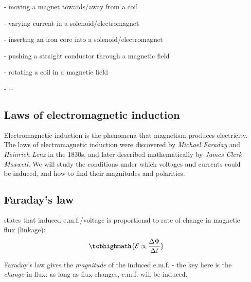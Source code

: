 \begin{compactenum}
	\item[-] moving a magnet towards/away from a coil
	
	\item[-] varying current in a solenoid/electromagnet
	
	\item[-] inserting an iron core into a solenoid/electromagnet
	
	\item[-] pushing a straight conductor through a magnetic field
	
	\item[-] rotating a coil in a magnetic field
	
	\item[-] $\cdots$
\end{compactenum}



\subsection{Laws of electromagnetic induction}

Electromagnetic induction is the phenomena that magnetism produces electricity. The laws of electromagnetic induction were discovered by \emph{Michael Faraday} and \emph{Heinrich Lenz} in the 1830s, and later described mathematically by \emph{James Clerk Maxwell}. We will study the conditions under which voltages and currents could be induced, and how to find their magnitudes and polarities.

\subsection{Faraday's law}

\rcyskip

\begin{ilight}
	 states that induced e.m.f./voltage is proportional to rate of change in magnetic flux (linkage): $$\tcbhighmath{\mathcal{E} \propto \frac{\Delta \Phi}{\Delta t}}$$
\end{ilight}

\cmt Faraday's law gives the \emph{magnitude} of the induced e.m.f. - the key here is the \emph{change} in flux: as long as flux changes, e.m.f. will be induced.


